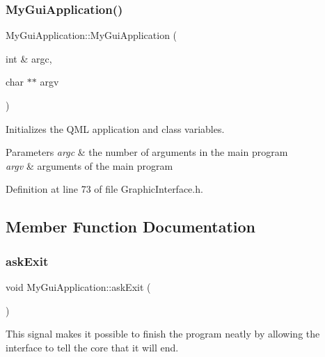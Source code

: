 \subsubsection{\texorpdfstring{My\+Gui\+Application()}{MyGuiApplication()}}
{\footnotesize\ttfamily My\+Gui\+Application\+::\+My\+Gui\+Application (\begin{DoxyParamCaption}\item[{int \&}]{argc,  }\item[{char $\ast$$\ast$}]{argv }\end{DoxyParamCaption})\hspace{0.3cm}{\ttfamily [inline]}}



Initializes the Q\+ML application and class variables. 


\begin{DoxyParams}{Parameters}
{\em argc} & the number of arguments in the main program \\
\hline
{\em argv} & arguments of the main program \\
\hline
\end{DoxyParams}


Definition at line 73 of file Graphic\+Interface.\+h.



\subsection{Member Function Documentation}
\mbox{\label{class_my_gui_application_a73b056e2f72052b960e94c4776ceda4a}} 
\subsubsection{\texorpdfstring{ask\+Exit}{askExit}}
{\footnotesize\ttfamily void My\+Gui\+Application\+::ask\+Exit (\begin{DoxyParamCaption}{ }\end{DoxyParamCaption})\hspace{0.3cm}{\ttfamily [signal]}}



This signal makes it possible to finish the program neatly by allowing the interface to tell the core that it will end. 

\mbox{\label{class_my_gui_application_a137204a4e17e47ba3d633942f83e7433}} 
